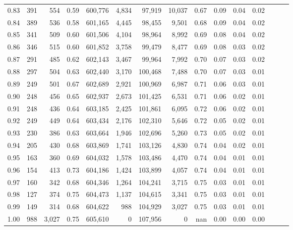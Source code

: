 \begin{tabular}{rrrrrrrrrrrrrrr}
0.83 &     391 &    554 &  0.59 &  600,776 &    4,834 &   97,919 &   10,037 &  0.67 &  0.09 &  0.04 &      0.02 \\
0.84 &     389 &    536 &  0.58 &  601,165 &    4,445 &   98,455 &    9,501 &  0.68 &  0.09 &  0.04 &      0.02 \\
0.85 &     341 &    509 &  0.60 &  601,506 &    4,104 &   98,964 &    8,992 &  0.69 &  0.08 &  0.04 &      0.02 \\
0.86 &     346 &    515 &  0.60 &  601,852 &    3,758 &   99,479 &    8,477 &  0.69 &  0.08 &  0.03 &      0.02 \\
0.87 &     291 &    485 &  0.62 &  602,143 &    3,467 &   99,964 &    7,992 &  0.70 &  0.07 &  0.03 &      0.02 \\
0.88 &     297 &    504 &  0.63 &  602,440 &    3,170 &  100,468 &    7,488 &  0.70 &  0.07 &  0.03 &      0.01 \\
0.89 &     249 &    501 &  0.67 &  602,689 &    2,921 &  100,969 &    6,987 &  0.71 &  0.06 &  0.03 &      0.01 \\
0.90 &     248 &    456 &  0.65 &  602,937 &    2,673 &  101,425 &    6,531 &  0.71 &  0.06 &  0.02 &      0.01 \\
0.91 &     248 &    436 &  0.64 &  603,185 &    2,425 &  101,861 &    6,095 &  0.72 &  0.06 &  0.02 &      0.01 \\
0.92 &     249 &    449 &  0.64 &  603,434 &    2,176 &  102,310 &    5,646 &  0.72 &  0.05 &  0.02 &      0.01 \\
0.93 &     230 &    386 &  0.63 &  603,664 &    1,946 &  102,696 &    5,260 &  0.73 &  0.05 &  0.02 &      0.01 \\
0.94 &     205 &    430 &  0.68 &  603,869 &    1,741 &  103,126 &    4,830 &  0.74 &  0.04 &  0.02 &      0.01 \\
0.95 &     163 &    360 &  0.69 &  604,032 &    1,578 &  103,486 &    4,470 &  0.74 &  0.04 &  0.01 &      0.01 \\
0.96 &     154 &    413 &  0.73 &  604,186 &    1,424 &  103,899 &    4,057 &  0.74 &  0.04 &  0.01 &      0.01 \\
0.97 &     160 &    342 &  0.68 &  604,346 &    1,264 &  104,241 &    3,715 &  0.75 &  0.03 &  0.01 &      0.01 \\
0.98 &     127 &    374 &  0.75 &  604,473 &    1,137 &  104,615 &    3,341 &  0.75 &  0.03 &  0.01 &      0.01 \\
0.99 &     149 &    314 &  0.68 &  604,622 &      988 &  104,929 &    3,027 &  0.75 &  0.03 &  0.01 &      0.01 \\
1.00 &     988 &  3,027 &  0.75 &  605,610 &        0 &  107,956 &        0 &   nan &  0.00 &  0.00 &      0.00 \\
\bottomrule
\end{tabular}
